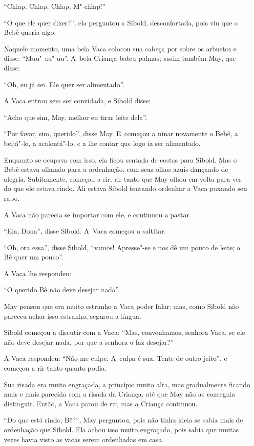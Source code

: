 ``Chlap, Chlap, Chlap, M"-chlap!''

``O que ele quer dizer?'', ela perguntou a Sibold, desconfortada, pois
viu que o Bebê queria algo.

Naquele momento, uma bela Vaca colocou sua cabeça por sobre os arbustos
e disse: ``Muu"-uu"-uu''. A~bela Criança bateu palmas; assim também May,
que disse:

``Oh, eu já sei. Ele quer ser alimentado''.

A Vaca entrou sem ser convidada, e Sibold disse:

``Acho que sim, May, melhor eu tirar leite dela''.

``Por favor, sim, querido'', disse May. E~começou a ninar novamente o
Bebê, a beijá"-lo, a acalentá"-lo, e a lhe contar que logo ia ser
alimentado.

Enquanto se ocupava com isso, ela ficou sentada de costas para Sibold.
Mas o Bebê estava olhando para a ordenhação, com seus olhos azuis
dançando de alegria. Subitamente, começou a rir, rir tanto que May olhou
em volta para ver do que ele estava rindo. Ali estava Sibold tentando
ordenhar a Vaca puxando seu rabo.

A Vaca não parecia se importar com ele, e continuou a pastar.

``Eia, Dona'', disse Sibold. A~Vaca começou a saltitar.

``Oh, ora essa'', disse Sibold, ``vamos! Apresse"-se e nos dê um pouco de
leite; o Bê quer um pouco''.

A Vaca lhe respondeu:

``O querido Bê não deve desejar nada''.

May pensou que era muito estranho a Vaca poder falar; mas, como Sibold
não pareceu achar isso estranho, segurou a língua.

Sibold começou a discutir com a Vaca: ``Mas, convenhamos, senhora Vaca,
se ele não deve desejar nada, por que a senhora o faz desejar?''

A Vaca respondeu: ``Não me culpe. A~culpa é sua. Tente de outro jeito'',
e começou a rir tanto quanto podia.

Sua risada era muito engraçada, a princípio muito alta, mas gradualmente
ficando mais e mais parecida com a risada da Criança, até que May não as
conseguia distinguir. Então, a Vaca parou de rir, mas a Criança
continuou.

``Do que está rindo, Bê?'', May perguntou, pois não tinha ideia se sabia
mais de ordenhação que Sibold. Ela achou isso muito engraçado, pois
sabia que muitas vezes havia visto as vacas serem ordenhadas em casa.

